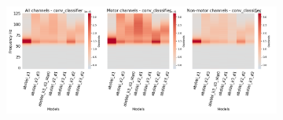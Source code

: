 \begin{figure}[!htpb]
\begin{subfigure}[b]{\textwidth}
   \includegraphics[width=1\linewidth]{img/appendix/A/conv-classifier/hp-sm/absVel-model_gradients_all_kinds}
   \caption{}
   \label{fig:absVel-hp-shifted-grads-conv-classifier}
\end{subfigure}

\caption[]{}
\label{fig:absVel-hp-shifted-grads}
\end{figure}